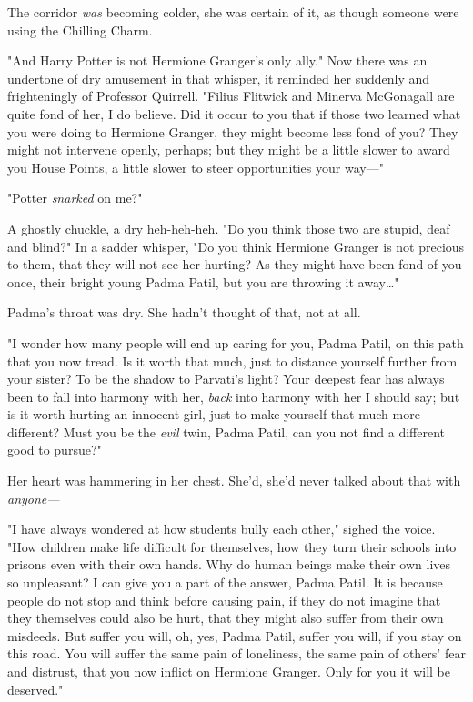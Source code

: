 The corridor \emph{was} becoming colder, she was certain of it, as though
someone were using the Chilling Charm.

"And Harry Potter is not Hermione Granger's only ally." Now there was an
undertone of dry amusement in that whisper, it reminded her suddenly and
frighteningly of Professor Quirrell. "Filius Flitwick and Minerva McGonagall
are quite fond of her, I do believe. Did it occur to you that if those two
learned what you were doing to Hermione Granger, they might become less fond of
you? They might not intervene openly, perhaps; but they might be a little
slower to award you House Points, a little slower to steer opportunities your
way---"

"Potter \emph{snarked} on me?"

A ghostly chuckle, a dry heh-heh-heh. "Do you think those two are stupid, deaf
and blind?" In a sadder whisper, "Do you think Hermione Granger is not precious
to them, that they will not see her hurting? As they might have been fond of
you once, their bright young Padma Patil, but you are throwing it away{\ldots}"

Padma's throat was dry. She hadn't thought of that, not at all.

"I wonder how many people will end up caring for you, Padma Patil, on this path
that you now tread. Is it worth that much, just to distance yourself further
from your sister? To be the shadow to Parvati's light? Your deepest fear has
always been to fall into harmony with her, \emph{back} into harmony with her I
should say; but is it worth hurting an innocent girl, just to make yourself
that much more different? Must you be the \emph{evil} twin, Padma Patil, can
you not find a different good to pursue?"

Her heart was hammering in her chest. She'd, she'd never talked about that with
\emph{anyone---}

"I have always wondered at how students bully each other," sighed the voice.
"How children make life difficult for themselves, how they turn their schools
into prisons even with their own hands. Why do human beings make their own
lives so unpleasant? I can give you a part of the answer, Padma Patil. It is
because people do not stop and think before causing pain, if they do not
imagine that they themselves could also be hurt, that they might also suffer
from their own misdeeds. But suffer you will, oh, yes, Padma Patil, suffer you
will, if you stay on this road. You will suffer the same pain of loneliness,
the same pain of others' fear and distrust, that you now inflict on Hermione
Granger. Only for you it will be deserved."

